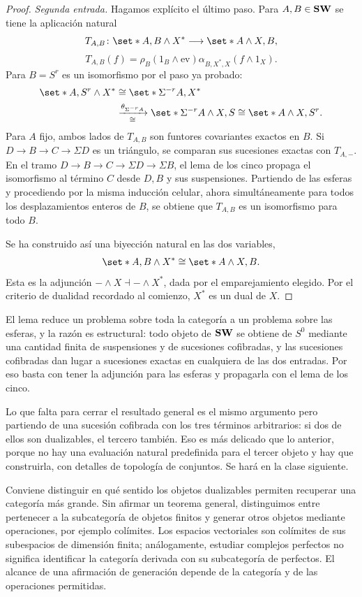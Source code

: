 \begin{proof}
\emph{Segunda entrada.}
Hagamos explícito el último paso. Para $A,B\in\mathbf{SW}$ se tiene la aplicación natural
\[
T_{A,B}\colon\set*{A,B\wedge X^*}
\longrightarrow\set*{A\wedge X,B},
\]
\[
T_{A,B}(f)=
\rho_B(1_B\wedge\mathrm{ev})\alpha_{B,X^*,X}(f\wedge1_X).
\]
Para $B=S^r$ es un isomorfismo por el paso ya probado:
\[
\begin{aligned}
\set*{A,S^r\wedge X^*}
&\cong\set*{\Sigma^{-r}A,X^*}\\
&\xrightarrow[\cong]{\theta_{\Sigma^{-r}A}}
\set*{\Sigma^{-r}A\wedge X,S}
\cong\set*{A\wedge X,S^r}.
\end{aligned}
\]
Para $A$ fijo, ambos lados de $T_{A,B}$ son funtores covariantes exactos en $B$. Si $D\to B\to C\to\Sigma D$ es un triángulo, se comparan sus sucesiones exactas con $T_{A,-}$. En el tramo
$D\to B\to C\to\Sigma D\to\Sigma B$,
el lema de los cinco propaga el isomorfismo al término $C$ desde $D,B$ y sus suspensiones. Partiendo de las esferas y procediendo por la misma inducción celular, ahora simultáneamente para todos los desplazamientos enteros de $B$, se obtiene que $T_{A,B}$ es un isomorfismo para todo $B$.

Se ha construido así una biyección natural en las dos variables,
\[
\set*{A,B\wedge X^*}\cong\set*{A\wedge X,B}.
\]
Esta es la adjunción $-\wedge X\dashv-\wedge X^*$, dada por el emparejamiento elegido. Por el criterio de dualidad recordado al comienzo, $X^*$ es un dual de $X$.
\end{proof}

\begin{nota}
   El lema reduce un problema sobre toda la categoría a un problema sobre las esferas, y la razón es estructural: todo objeto de $\mathbf{SW}$ se obtiene de $S^0$ mediante una cantidad finita de suspensiones y de sucesiones cofibradas, y las sucesiones cofibradas dan lugar a sucesiones exactas en cualquiera de las dos entradas. Por eso basta con tener la adjunción para las esferas y propagarla con el lema de los cinco.

   Lo que falta para cerrar el resultado general es el mismo argumento pero partiendo de una sucesión cofibrada con los tres términos arbitrarios: si dos de ellos son dualizables, el tercero también. Eso es más delicado que lo anterior, porque no hay una evaluación natural predefinida para el tercer objeto y hay que construirla, con detalles de topología de conjuntos. Se hará en la clase siguiente.
\end{nota}

\begin{nota}
Conviene distinguir en qué sentido los objetos dualizables permiten recuperar una categoría más grande. Sin afirmar un teorema general, distinguimos entre pertenecer a la subcategoría de objetos finitos y generar otros objetos mediante operaciones, por ejemplo colímites. Los espacios vectoriales son colímites de sus subespacios de dimensión finita; análogamente, estudiar complejos perfectos no significa identificar la categoría derivada con su subcategoría de perfectos. El alcance de una afirmación de generación depende de la categoría y de las operaciones permitidas.

\end{nota}
